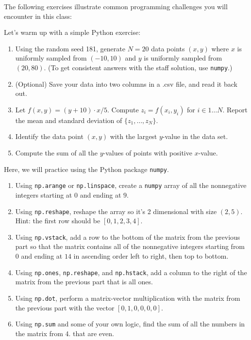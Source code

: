 \documentclass{harvardml}
\theoremstyle{definition}
\theoremstyle{plain}
\begin{document}
The following exercises illustrate common programming challenges you will
encounter in this class:\\

\begin{problem}
Let's warm up with a simple Python exercise:

\begin{enumerate}[label=(\alph*)]
    \item Using the random seed 181, generate $N = 20$ data points $(x,y)$ where $x$ is uniformly sampled from $(-10,10)$ and $y$ is uniformly sampled from $(20,80)$. (To get consistent answers with the staff solution, use \verb|numpy|.) 
    \item (Optional) Save your data into two columns in a .csv file, and read it back out. 
    \item Let $f(x,y) = (y+10) \cdot x/5$. Compute $z_i = f(x_i,y_i)$ for $i \in 1 \ldots N$. Report the mean and standard deviation of $\{z_1, \ldots, z_N\}$.
    \item Identify the data point $(x,y)$ with the largest $y$-value in the data set.
    \item Compute the sum of all the $y$-values of points with positive $x$-value.
\end{enumerate}
\end{problem}


\begin{problem}
Here, we will practice using the Python package \verb|numpy|.

\begin{enumerate}[label=(\alph*)]
    \item Using \verb|np.arange| or \verb|np.linspace|, create a \verb|numpy| array of all the nonnegative integers starting at $0$ and ending at $9$.
    \item Using \verb|np.reshape|, reshape the array so it's 2 dimensional with size $(2, 5)$. Hint: the first row should be $[0, 1,2,3,4]$.
    \item Using \verb|np.vstack|, add a row to the bottom of the matrix from the previous part so that the matrix contains all of the nonnegative integers starting from $0$ and ending at $14$ in ascending order left to right, then top to bottom.
    \item Using \verb|np.ones|, \verb|np.reshape|, and \verb|np.hstack|, add a column to the right of the matrix from the previous part that is all ones.
    \item Using \verb|np.dot|, perform a matrix-vector multiplication with the matrix from the previous part with the vector $[0, 1, 0, 0, 0, 0]$.
    \item Using \verb|np.sum| and some of your own logic, find the sum of all the numbers in the matrix from 4. that are even.
\end{enumerate}
\end{problem}
\end{document}
